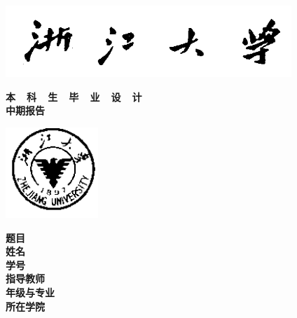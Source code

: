 \thispagestyle{empty}

{
\setlength{\parindent}{0em}
\renewcommand{\baselinestretch}{2}

\vspace*{-7mm}

\begin{center}
  \includegraphics[width=108mm]{data/cover/xiaoming}
\end{center}

\vspace{-1mm}

{
\renewcommand{\baselinestretch}{1.8}
\heiti\erhao\bfseries
\centering
本~~科~~生~~毕~~业~~设~~计 \\
中期报告 \par
}

\vspace{4em}

\begin{center}
  \includegraphics[width=35mm]{data/cover/xiaobiao}
\end{center}

\vspace{3em}

{
\renewcommand{\baselinestretch}{1.65}
\songti\sanhao\bfseries
\centering
题目 \; \underline{\makebox[16em]{\zjutitlec}} \\
姓名 \; \underline{\makebox[16em]{\zjuauthornamec}} \\
学号 \; \underline{\makebox[16em]{\zjuauthorid}} \\
指导教师 \; \underline{\makebox[14em]{\zjumentorc}} \\
年级与专业 \; \underline{\makebox[13em]{\zjugrade~~\zjumajor}} \\
所在学院 \; \underline{\makebox[14em]{\zjucollegec}} \par
}
}

